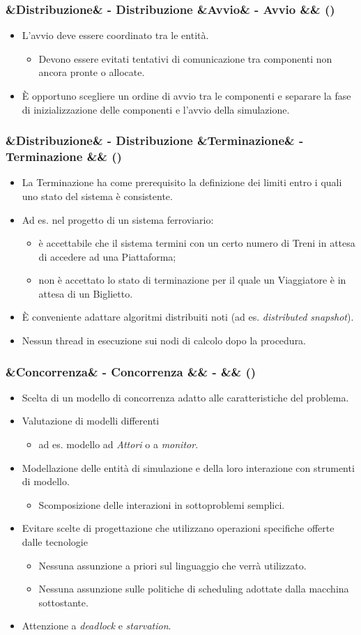 \documentclass[slidestop,compress,blackandwhite]{beamer}
\newcommand{\ii}[1]{\textit{#1}}
\newcommand{\cm}[1]{\vspace{#1cm}}
\newcommand{\newtitle}[4]{
	#1 
	\ifx&#2&%
	\else
  		\large- #2
	\fi
	\ifx&#3&%
	\else
  		\normalsize- #3
	\fi
	\ifx&#4&%
	\else
  		\normalsize (#4)
	\fi
}
\newcommand{\newframe}[5]{
	\begin{frame}
		\frametitle{\newtitle{#1}{#2}{#3}{#4}}
		#5
	\end{frame}
}
\newcommand{\myitemize}[1]{
	\begin{itemize}\itemsep4pt
	#1
	\end{itemize}
}
\begin{document}
	\newframe{}{Distribuzione}{Avvio}{}{
		\cm{0.5}
		\justifying
		\myitemize{
			\item L'avvio deve essere coordinato tra le entità.
				\cm{0.3}
				\myitemize {
					\item Devono essere evitati tentativi di comunicazione tra componenti non ancora pronte o allocate.
				}
				\cm{0.3}
			\item \`E opportuno scegliere un ordine di avvio tra le componenti e separare la fase di inizializzazione delle componenti e l'avvio della simulazione.
		}
		
	}
	
	\newframe{}{Distribuzione}{Terminazione}{}{
		\cm{0.5}
		\myitemize{
			\item La Terminazione ha come prerequisito la definizione dei limiti entro i quali uno stato del sistema è consistente. 
			\item Ad es. nel progetto di un sistema ferroviario:
				\myitemize {
					\item è accettabile che il sistema termini con un certo numero di Treni in attesa di accedere ad una Piattaforma;
					\item non è accettato lo stato di terminazione per il quale un Viaggiatore è in attesa di un Biglietto.
				}
			\item \`E conveniente adattare algoritmi distribuiti noti (ad es. \ii{distributed snapshot}).
			\item Nessun thread in esecuzione sui nodi di calcolo dopo la procedura.
		}
	}
	
	
	\newframe{}{Concorrenza}{}{}{
		\justifying
		\myitemize {
			\item Scelta di un modello di concorrenza adatto alle caratteristiche del problema.
			\item Valutazione di modelli differenti
				\myitemize{
					\item ad es. modello ad \ii{Attori} o a \ii{monitor}.
				}
			\item Modellazione delle entità di simulazione e della loro interazione con strumenti di modello.
				\myitemize {
					\item Scomposizione delle interazioni in sottoproblemi semplici.
				}
			\item Evitare scelte di progettazione che utilizzano operazioni specifiche offerte dalle tecnologie
				\myitemize {
					\item Nessuna assunzione a priori sul linguaggio che verrà utilizzato.
					\item Nessuna assunzione sulle politiche di scheduling adottate dalla macchina sottostante.
				}
			\item Attenzione a \ii{deadlock} e \ii{starvation}.
				
		}
		
	}
	
\end{document}
